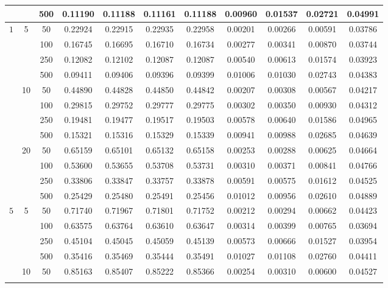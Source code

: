 \documentclass[10pt]{article}
\begin{document}
\begin{center}
\begin{longtable}{ccccccccccc}
		&&500& 0.11190 & 0.11188 & 0.11161 & 0.11188 & 0.00960 & 0.01537 & 0.02721 & 0.04991 \\ \hline
		\multirow{12}{*}{$1$}
		& \multirow{4}{*}{5}&50 & 0.22924 & 0.22915 & 0.22935 & 0.22958 & 0.00201 & 0.00266 & 0.00591 & 0.03786 \\ \cline{3-11}
		&&100 & 0.16745 & 0.16695 & 0.16710 & 0.16734 & 0.00277 & 0.00341 & 0.00870 & 0.03744 \\ \cline{3-11}
		&&250 & 0.12082 & 0.12102 & 0.12087 & 0.12087 & 0.00540 & 0.00613 & 0.01574 & 0.03923 \\ \cline{3-11}
		&&500 & 0.09411 & 0.09406 & 0.09396 & 0.09399 & 0.01006 & 0.01030 & 0.02743 & 0.04383 \\ \cline{2-11}
		& \multirow{4}{*}{10}&50& 0.44890 & 0.44828 & 0.44850 & 0.44842 & 0.00207 & 0.00308 & 0.00567 & 0.04217 \\ \cline{3-11}
		&&100& 0.29815 & 0.29752 & 0.29777 & 0.29775 & 0.00302 & 0.00350 & 0.00930 & 0.04312 \\ \cline{3-11}
		&&250& 0.19481 & 0.19477 & 0.19517 & 0.19503 & 0.00578 & 0.00640 & 0.01586 & 0.04965 \\ \cline{3-11}
		&&500& 0.15321 & 0.15316 & 0.15329 & 0.15339 & 0.00941 & 0.00988 & 0.02685 & 0.04639 \\ \cline{2-11}
		& \multirow{4}{*}{20}&50& 0.65159 & 0.65101 & 0.65132 & 0.65158 & 0.00253 & 0.00288 & 0.00625 & 0.04664 \\ \cline{3-11}
		&&100& 0.53600 & 0.53655 & 0.53708 & 0.53731 & 0.00310 & 0.00371 & 0.00841 & 0.04766 \\ \cline{3-11}
		&&250& 0.33806 & 0.33847 & 0.33757 & 0.33878 & 0.00591 & 0.00575 & 0.01612 & 0.04525 \\ \cline{3-11}
		&&500& 0.25429 & 0.25480 & 0.25491 & 0.25456 & 0.01012 & 0.00956 & 0.02610 & 0.04889 \\ \hline
		\multirow{12}{*}{$5$}
		& \multirow{4}{*}{5}&50 & 0.71740 & 0.71967 & 0.71801 & 0.71752 & 0.00212 & 0.00294 & 0.00662 & 0.04423 \\ \cline{3-11}
		&&100 & 0.63575 & 0.63764 & 0.63610 & 0.63647 & 0.00314 & 0.00399 & 0.00765 & 0.03694 \\ \cline{3-11}
		&&250 & 0.45104 & 0.45045 & 0.45059 & 0.45139 & 0.00573 & 0.00666 & 0.01527 & 0.03954 \\ \cline{3-11}
		&&500 & 0.35416 & 0.35469 & 0.35444 & 0.35491 & 0.01027 & 0.01108 & 0.02760 & 0.04411 \\ \cline{2-11} 
		& \multirow{4}{*}{10}&50& 0.85163 & 0.85407 & 0.85222 & 0.85366 & 0.00254 & 0.00310 & 0.00600 & 0.04527 \\ \cline{3-11}

\end{longtable}
\end{center}
\end{document}
